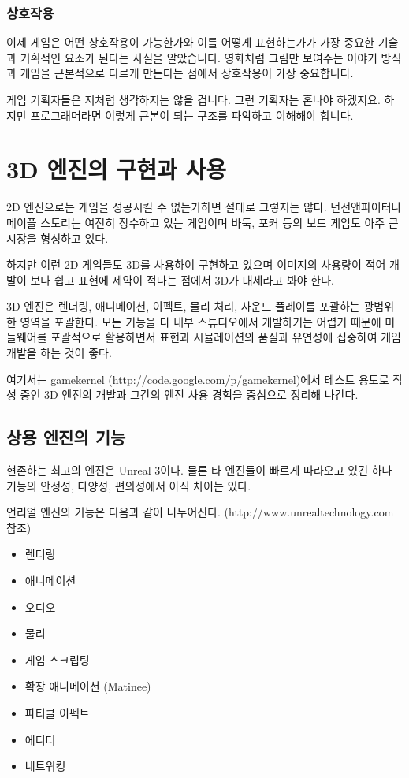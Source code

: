 \documentclass[chapter,kosection, 10.5pt, romanfixed, a4paper]{oblivoir}
\begin{document}
\subsection{상호작용}

이제 게임은 어떤 상호작용이 가능한가와 이를 어떻게 표현하는가가 가장 중요한 기술과 기획적인 요소가 된다는
사실을 알았습니다. 영화처럼 그림만 보여주는 이야기 방식과 게임을 근본적으로 다르게 만든다는 점에서 
상호작용이 가장 중요합니다. 


게임 기획자들은 저처럼 생각하지는 않을 겁니다. 그런 기획자는 혼나야 하겠지요. 하지만 프로그래머라면
이렇게 근본이 되는 구조를 파악하고 이해해야 합니다. 


\chapter{3D 엔진의 구현과 사용}

2D 엔진으로는 게임을 성공시킬 수 없는가하면 절대로 그렇지는 않다. 던전앤파이터나 메이플 스토리는
여전히 장수하고 있는 게임이며 바둑, 포커 등의 보드 게임도 아주 큰 시장을 형성하고 있다. 

하지만 이런 2D 게임들도 3D를 사용하여 구현하고 있으며 이미지의 사용량이 적어 개발이 보다 쉽고 
표현에 제약이 적다는 점에서 3D가 대세라고 봐야 한다. 

3D 엔진은 렌더링, 애니메이션, 이펙트, 물리 처리, 사운드 플레이를 포괄하는 광범위한 영역을 
포괄한다. 모든 기능을 다 내부 스튜디오에서 개발하기는 어렵기 때문에 미들웨어를 포괄적으로 
활용하면서 표현과 시뮬레이션의 품질과 유연성에 집중하여 게임 개발을 하는 것이 좋다. 

여기서는 gamekernel (http://code.google.com/p/gamekernel)에서 테스트 용도로 작성 중인 
3D 엔진의 개발과 그간의 엔진 사용 경험을 중심으로 정리해 나간다. 

\section{상용 엔진의 기능}

현존하는 최고의 엔진은 Unreal 3이다. 물론 타 엔진들이 빠르게 따라오고 있긴 하나 기능의 
안정성, 다양성, 편의성에서 아직 차이는 있다. 

언리얼 엔진의 기능은 다음과 같이 나누어진다. (http://www.unrealtechnology.com 참조)
\begin{itemize}
\item 렌더링 
\item 애니메이션
\item 오디오 
\item 물리 
\item 게임 스크립팅
\item 확장 애니메이션 (Matinee)
\item 파티클 이펙트
\item 에디터 
\item 네트워킹
\end{itemize}
\end{document}
